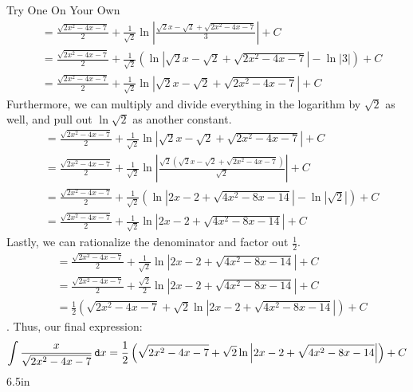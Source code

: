 \begin{exercise}{Try One On Your Own \Coffeecup \Coffeecup \Coffeecup}
{\begin{align*}
&=\frac{\sqrt{2x^2-4x-7}}{2}+\frac{1}{\sqrt{2}}\ln\left|\frac{\sqrt{2}x-\sqrt{2}+\sqrt{2x^2-4x-7}}{3}\right|+C\\
&=\frac{\sqrt{2x^2-4x-7}}{2}+\frac{1}{\sqrt{2}}\left(\ln\left|\sqrt{2}x-\sqrt{2}+\sqrt{2x^2-4x-7}\right|-\ln|3|\right)+C\\
&=\frac{\sqrt{2x^2-4x-7}}{2}+\frac{1}{\sqrt{2}}\ln\left|\sqrt{2}x-\sqrt{2}+\sqrt{2x^2-4x-7}\right|+C
\end{align*}
Furthermore, we can multiply and divide everything in the logarithm by $\sqrt{2}$ as well, and pull out $\ln\sqrt{2}$ as another constant.
\begin{align*}
&=\frac{\sqrt{2x^2-4x-7}}{2}+\frac{1}{\sqrt{2}}\ln\left|\sqrt{2}x-\sqrt{2}+\sqrt{2x^2-4x-7}\right|+C\\
&=\frac{\sqrt{2x^2-4x-7}}{2}+\frac{1}{\sqrt{2}}\ln\left|\frac{\sqrt{2}\left(\sqrt{2}x-\sqrt{2}+\sqrt{2x^2-4x-7}\right)}{\sqrt{2}}\right|+C\\
&=\frac{\sqrt{2x^2-4x-7}}{2}+\frac{1}{\sqrt{2}}\left(\ln\left|2x-2+\sqrt{4x^2-8x-14}\right|-\ln|\sqrt{2}|\right)+C\\
&=\frac{\sqrt{2x^2-4x-7}}{2}+\frac{1}{\sqrt{2}}\ln\left|2x-2+\sqrt{4x^2-8x-14}\right|+C
\end{align*}
Lastly, we can rationalize the denominator and factor out $\frac{1}{2}$.
\begin{align*}
&=\frac{\sqrt{2x^2-4x-7}}{2}+\frac{1}{\sqrt{2}}\ln\left|2x-2+\sqrt{4x^2-8x-14}\right|+C\\
&=\frac{\sqrt{2x^2-4x-7}}{2}+\frac{\sqrt{2}}{2}\ln\left|2x-2+\sqrt{4x^2-8x-14}\right|+C\\
&=\frac{1}{2}\left(\sqrt{2x^2-4x-7}+\sqrt{2}\ln\left|2x-2+\sqrt{4x^2-8x-14}\right|\right)+C
\end{align*}.
Thus, our final expression:
$$\int \frac{x}{\sqrt{2x^2-4x-7}}\mathop{}\!\mathtt{d} x=\frac{1}{2}\left(\sqrt{2x^2-4x-7}+\sqrt{2}\ln\left|2x-2+\sqrt{4x^2-8x-14}\right|\right)+C$$}{6.5in}
\end{exercise}

